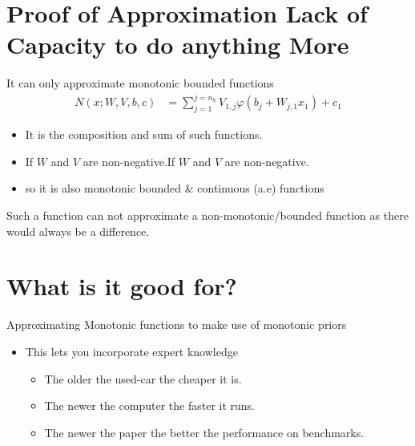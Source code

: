 \documentclass[dvipsnames,handout]{beamer}
\renewcommand{\v}{\varphi}
\begin{document}
\section{Proof of Approximation Lack of Capacity to do anything More}
\begin{frame}{It can only approximate monotonic bounded functions}
	\begin{align*}
		N(x;W,V,b,c) &= \sum_{j=1}^{j=n_h} V_{1,j} \v (b_j+W_{j,1}x_1) + c_1
	\end{align*}
	\begin{itemize}
		\item It is the composition and sum of such functions.
		\item If $W$ and $V$ are non-negative.If $W$ and $V$ are non-negative.
		\item so it is also monotonic bounded \& continuous (a.e) functions
	\end{itemize}

	
	Such a function can not approximate a non-monotonic/bounded function as there would always be a difference.
\end{frame}


\section{What is it good for?}

\begin{frame}{Approximating Monotonic functions to make use of monotonic priors}

	\begin{itemize}
		\item This lets you incorporate expert knowledge
		\begin{itemize}
			\item The older the used-car the cheaper it is.
			\item The newer the computer the faster it runs.
			\item The newer the paper the better the performance on benchmarks.
		\end{itemize}
	\end{itemize}

\end{frame}
\end{document}
